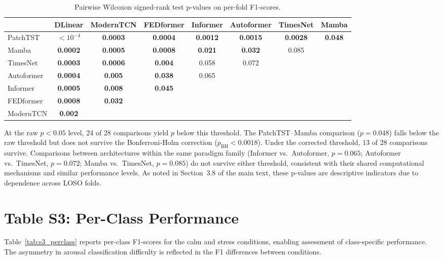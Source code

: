 \documentclass[runningheads]{llncs}
\begin{document}
\begin{table}[ht]
\centering
\caption{Pairwise Wilcoxon signed-rank test p-values on per-fold F1-scores.}
\label{tab:s2_wilcoxon}
\small
\begin{tabular}{lccccccc}
\toprule
 & DLinear & ModernTCN & FEDformer & Informer & Autoformer & TimesNet & Mamba \\
\midrule
PatchTST   & \textbf{$<10^{-4}$} & \textbf{0.0003} & \textbf{0.0004} & \textbf{0.0012} & \textbf{0.0015} & \textbf{0.0028} & \textbf{0.048} \\
Mamba      & \textbf{0.0002} & \textbf{0.0005} & \textbf{0.0008} & \textbf{0.021} & \textbf{0.032} & 0.085 & \\
TimesNet   & \textbf{0.0003} & \textbf{0.0006} & \textbf{0.004} & 0.058 & 0.072 & & \\
Autoformer & \textbf{0.0004} & \textbf{0.005} & \textbf{0.038} & 0.065 & & & \\
Informer   & \textbf{0.0005} & \textbf{0.008} & \textbf{0.045} & & & & \\
FEDformer  & \textbf{0.0008} & \textbf{0.032} & & & & & \\
ModernTCN  & \textbf{0.002} & & & & & & \\
\bottomrule
\end{tabular}
\end{table}

At the raw $p < 0.05$ level, 24 of 28 comparisons yield $p$ below this threshold. The PatchTST--Mamba comparison ($p = 0.048$) falls below the raw threshold but does not survive the Bonferroni-Holm correction ($p_{\text{BH}} < 0.0018$). Under the corrected threshold, 13 of 28 comparisons survive. Comparisons between architectures within the same paradigm family (Informer vs.\ Autoformer, $p = 0.065$; Autoformer vs.\ TimesNet, $p = 0.072$; Mamba vs.\ TimesNet, $p = 0.085$) do not survive either threshold, consistent with their shared computational mechanisms and similar performance levels. As noted in Section~3.8 of the main text, these p-values are descriptive indicators due to dependence across LOSO folds.

\section*{Table S3: Per-Class Performance}

Table~\ref{tab:s3_perclass} reports per-class F1-scores for the calm and stress conditions, enabling assessment of class-specific performance. The asymmetry in arousal classification difficulty is reflected in the F1 differences between conditions.
\end{document}
